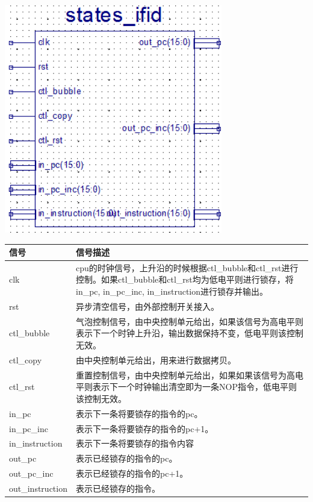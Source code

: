 \begin{center}
    \includegraphics[height=10cm]{image/detail/detail_ifid.png}

    \begin{tabular}{|p{3.5cm}|p{11cm}|}
        \hline 信号 & 信号描述 \\
        \hline clk & cpu的时钟信号，上升沿的时候根据ctl\_bubble和ctl\_rst进行控制。如果ctl\_bubble和ctl\_rst均为低电平则进行锁存，将in\_pc, in\_pc\_inc, in\_instruction进行锁存并输出。 \\
        \hline rst & 异步清空信号，由外部控制开关接入。 \\
        \hline ctl\_bubble & 气泡控制信号，由中央控制单元给出，如果该信号为高电平则表示下一个时钟上升沿，输出数据保持不变，低电平则该控制无效。 \\
        \hline ctl\_copy &  由中央控制单元给出，用来进行数据拷贝。\\
        \hline ctl\_rst & 重置控制信号，由中央控制单元给出，如果如果该信号为高电平则表示下一个时钟输出清空即为一条NOP指令，低电平则该控制无效。 \\
        \hline in\_pc & 表示下一条将要锁存的指令的pc。 \\
        \hline in\_pc\_inc & 表示下一条将要锁存的指令的pc+1。 \\
        \hline in\_instruction & 表示下一条将要锁存的指令内容 \\
        \hline out\_pc & 表示已经锁存的指令的pc。 \\
        \hline out\_pc\_inc & 表示已经锁存的指令的pc+1。 \\
        \hline out\_instruction & 表示已经锁存的指令。 \\
        \hline
    \end{tabular}

\end{center}

